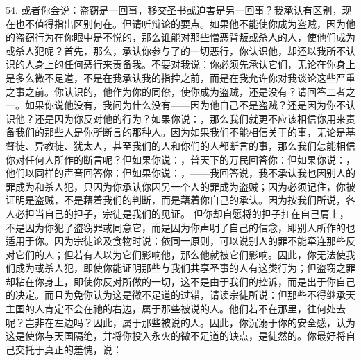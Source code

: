 54. 或者你会说：盗窃是一回事，移交圣书或迫害是另一回事？我承认有区别，现在也不值得指出区别何在。但请听辩论的要点。如果他不能使你成为盗贼，因为他的盗窃行为在你眼中是不悦的，那么谁能对那些憎恶背叛或杀人的人，使他们成为或杀人犯呢？首先，那么，承认你参与了的一切恶行，你认识他，却还以我所不认识的人身上的任何恶行来责备我。不要对我说：你必须先承认它们，无论在你身上是多么微不足道，不是在我承认我的指控之前，而是在我允许你对我谈论这些严重之事之前。你认识的，他作为你的同僚，使你成为盗贼，还是没有？请回答二者之一。如果你说他没有，我问为什么没有——因为他自己不是盗贼？还是因为你不认识他？还是因为你反对他的行为？如果你说：，那么我们就更不应该相信你用来责备我们的那些人是你所断言的那种人。因为如果我们不能相信关于的事，无论是基督徒、异教徒、犹太人，甚至我们的人和你们的人都断言的事，那么我们怎能相信你对任何人所作的断言呢？但如果你说：，普天下的万民回答你：但如果你说：，他们以同样的声音回答你：但如果你说：，——我回答说，我不承认我也因别人的罪成为和杀人犯，只因为你承认你因另一个人的罪成为盗贼；因为必须记住，你被证明是盗贼，不是藉着我们的判断，而是藉着你自己的承认。因为按我们所说，各人必担当自己的担子，宗徒是我们的见证。 但你却自愿将的担子扛在自己肩上，不是因为你犯了盗窃罪或同意它，而是因为你声明了自己的信念，即别人所作的也适用于你。因为宗徒论及食物时说：依同一原则，可以说别人的罪不能牵连那些反对它们的人；但若有人以为它们影响他，那么他就被它们影响。因此，你无法使我们成为或杀人犯，即使你能证明那些与我们共享圣事的人有这类行为；但盗窃之罪却粘在你身上，即使你反对所做的一切，这不是由于我们的控诉，而是出于你自己的决定。而且为免你认为这是微不足道的过错，请读宗徒所说：但那些不得继承天主国的人肯定不会在祂的右边，属于那些被说的人。他们若不在那里，往何处去呢？岂非在左边吗？因此，属于那些被说的人。因此，你沉溺于你的安全感，认为这是使你与天国隔绝，并将你投入永火的微不足道的缺点，是徒然的。你最好将自己交托于真正的羞愧，说：\par


